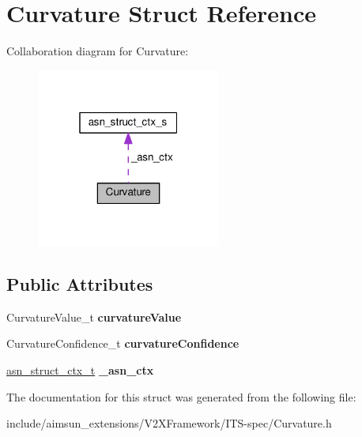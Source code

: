\hypertarget{structCurvature}{}\section{Curvature Struct Reference}
\label{structCurvature}


Collaboration diagram for Curvature\+:\nopagebreak
\begin{figure}[H]
\begin{center}
\leavevmode
\includegraphics[width=172pt]{structCurvature__coll__graph}
\end{center}
\end{figure}
\subsection*{Public Attributes}
\begin{DoxyCompactItemize}
\item 
Curvature\+Value\+\_\+t {\bfseries curvature\+Value}\hypertarget{structCurvature_a95f6c13d4499eb9dd409df6507dde547}{}\label{structCurvature_a95f6c13d4499eb9dd409df6507dde547}

\item 
Curvature\+Confidence\+\_\+t {\bfseries curvature\+Confidence}\hypertarget{structCurvature_a21e297cd1422c9ecdf23c28493c0ad6a}{}\label{structCurvature_a21e297cd1422c9ecdf23c28493c0ad6a}

\item 
\hyperlink{structasn__struct__ctx__s}{asn\+\_\+struct\+\_\+ctx\+\_\+t} {\bfseries \+\_\+asn\+\_\+ctx}\hypertarget{structCurvature_aff39179be86af9e7286324f025fe1484}{}\label{structCurvature_aff39179be86af9e7286324f025fe1484}

\end{DoxyCompactItemize}


The documentation for this struct was generated from the following file\+:\begin{DoxyCompactItemize}
\item 
include/aimsun\+\_\+extensions/\+V2\+X\+Framework/\+I\+T\+S-\/spec/Curvature.\+h\end{DoxyCompactItemize}
